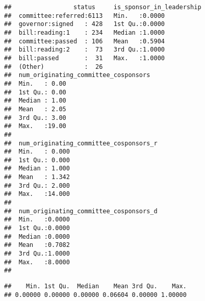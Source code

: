 \documentclass[]{article}
\newenvironment{Shaded}{\begin{snugshade}}{\end{snugshade}}
\newcommand{\KeywordTok}[1]{\textcolor[rgb]{0.13,0.29,0.53}{\textbf{#1}}}
\newcommand{\DecValTok}[1]{\textcolor[rgb]{0.00,0.00,0.81}{#1}}
\newcommand{\StringTok}[1]{\textcolor[rgb]{0.31,0.60,0.02}{#1}}
\newcommand{\CommentTok}[1]{\textcolor[rgb]{0.56,0.35,0.01}{\textit{#1}}}
\newcommand{\OperatorTok}[1]{\textcolor[rgb]{0.81,0.36,0.00}{\textbf{#1}}}
\newcommand{\NormalTok}[1]{#1}
\begin{document}
\begin{verbatim}
##                 status     is_sponsor_in_leadership
##  committee:referred:6113   Min.   :0.0000          
##  governor:signed   : 428   1st Qu.:0.0000          
##  bill:reading:1    : 234   Median :1.0000          
##  committee:passed  : 106   Mean   :0.5904          
##  bill:reading:2    :  73   3rd Qu.:1.0000          
##  bill:passed       :  31   Max.   :1.0000          
##  (Other)           :  26                           
##  num_originating_committee_cosponsors
##  Min.   : 0.00                       
##  1st Qu.: 0.00                       
##  Median : 1.00                       
##  Mean   : 2.05                       
##  3rd Qu.: 3.00                       
##  Max.   :19.00                       
##                                      
##  num_originating_committee_cosponsors_r
##  Min.   : 0.000                        
##  1st Qu.: 0.000                        
##  Median : 1.000                        
##  Mean   : 1.342                        
##  3rd Qu.: 2.000                        
##  Max.   :14.000                        
##                                        
##  num_originating_committee_cosponsors_d
##  Min.   :0.0000                        
##  1st Qu.:0.0000                        
##  Median :0.0000                        
##  Mean   :0.7082                        
##  3rd Qu.:1.0000                        
##  Max.   :8.0000                        
## 
\end{verbatim}

\begin{Shaded}
\end{Shaded}

\begin{verbatim}
##    Min. 1st Qu.  Median    Mean 3rd Qu.    Max. 
## 0.00000 0.00000 0.00000 0.06604 0.00000 1.00000
\end{verbatim}
\end{document}
